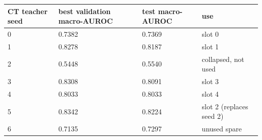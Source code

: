 \begin{tabular}{llll}
\toprule
CT teacher seed & best validation macro-AUROC & test macro-AUROC & use \\
\midrule
0 & 0.7382 & 0.7369 & slot 0 \\
1 & 0.8278 & 0.8187 & slot 1 \\
2 & 0.5448 & 0.5540 & collapsed, not used \\
3 & 0.8308 & 0.8091 & slot 3 \\
4 & 0.8033 & 0.8033 & slot 4 \\
5 & 0.8342 & 0.8224 & slot 2 (replaces seed 2) \\
6 & 0.7135 & 0.7297 & unused spare \\
\bottomrule
\end{tabular}
